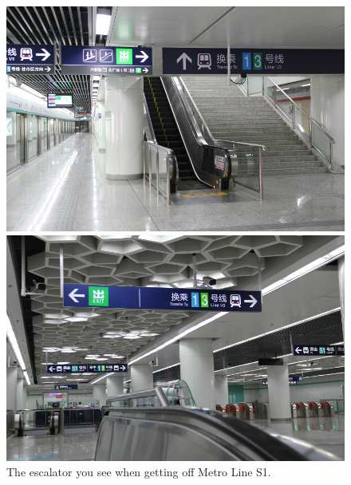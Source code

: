 \documentclass[11pt]{article}
\begin{document}
 \begin{figure}[!h]
	\begin{minipage}[t]{.5\textwidth}
     	\centering
        	\includegraphics[scale=0.27]{IMG_7164.jpg}
	\end{minipage}%
     \begin{minipage}[t]{.5\textwidth}
         \centering
         \includegraphics[scale=0.27]{IMG_7166.jpg}
    \end{minipage}%
    	\caption{The escalator you see when getting off Metro Line S1.\label{IMG_7166}}
 \end{figure}
\end{document}
